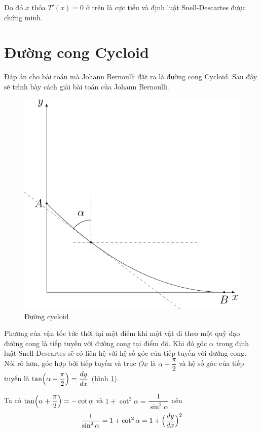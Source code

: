 Do đó $x$ thỏa $T'(x) = 0$ ở trên là cực tiểu và định luật Snell-Descartes được chứng minh.

\section*{Đường cong Cycloid}

Đáp án cho bài toán mà Johann Bernoulli đặt ra là đường cong Cycloid. Sau đây sẽ trình bày cách giải bài toán của Johann Bernoulli.

\begin{figure}[ht]
    \centering
    \includegraphics{brachistochrone/cycloid.pdf}
    \caption{Đường cycloid}
    \label{cycloid:im1}
\end{figure}

Phương của vận tốc tức thời tại một điểm khi một vật đi theo một quỹ đạo đường cong là tiếp tuyến với đường cong tại điểm đó. Khi đó góc $\alpha$ trong định luật Snell-Descartes sẽ có liên hệ với hệ số góc của tiếp tuyến với đường cong. Nói rõ hơn, góc hợp bởi tiếp tuyến và trục $Ox$ là $\alpha + \dfrac{\pi}{2}$ và hệ số góc của tiếp tuyến là $\tan \Bigl(\alpha + \dfrac{\pi}{2}\Bigr) = \dfrac{dy}{dx}$ (hình \ref{cycloid:im1}).

Ta có $\tan \Bigl( \alpha + \dfrac{\pi}{2} \Bigr) = -\cot \alpha$ và $1 + \cot^2 \alpha = \dfrac{1}{\sin^2 \alpha}$ nên 
\begin{equation}
    \dfrac{1}{\sin^2 \alpha} = 1 + \cot^2 \alpha = 1 + \Bigl(\dfrac{dy}{dx}\Bigl)^2
\end{equation}

